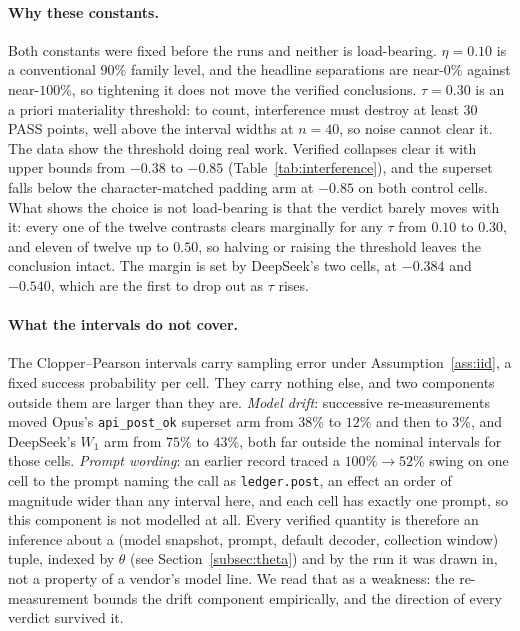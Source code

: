 \documentclass[11pt]{article}
\theoremstyle{plain}
\theoremstyle{definition}
\theoremstyle{remark}
\begin{document}
\paragraph{Why these constants.}
Both constants were fixed before the runs and neither is load-bearing. $\eta=0.10$ is a
conventional $90\%$ family level, and the headline separations are near-$0\%$ against near-$100\%$,
so tightening it does not move the verified conclusions. $\tau=0.30$ is an a priori materiality
threshold: to count, interference must destroy at least $30$ PASS points, well above the interval
widths at $n=40$, so noise cannot clear it. The data show the threshold doing real work. Verified
collapses clear it with upper bounds from $-0.38$ to $-0.85$ (Table~\ref{tab:interference}), and
the superset falls below the character-matched padding arm at $-0.85$ on both control cells. What
shows the choice is not load-bearing is that
the verdict barely moves with it: every one of the twelve contrasts clears marginally for any
$\tau$ from $0.10$ to $0.30$, and eleven of twelve up to $0.50$, so halving or raising the
threshold leaves the conclusion intact. The margin is set by DeepSeek's two cells, at $-0.384$
and $-0.540$, which are the first to drop out as $\tau$ rises.

\paragraph{What the intervals do not cover.}
The Clopper--Pearson intervals carry sampling error under Assumption~\ref{ass:iid}, a fixed success
probability per cell. They carry nothing else, and two components outside them are larger than they
are. \emph{Model drift}: successive re-measurements moved Opus's \texttt{api\_post\_ok} superset arm
from $38\%$ to $12\%$ and then to $3\%$, and DeepSeek's $W_1$ arm from $75\%$ to $43\%$, both far
outside the nominal intervals for those cells. \emph{Prompt wording}: an earlier record traced a $100\%\to52\%$ swing
on one cell to the prompt naming the call as \texttt{ledger.post}, an effect an order of magnitude
wider than any interval here, and each cell has exactly one prompt, so this component is not
modelled at all. Every verified quantity is therefore an inference about a (model snapshot, prompt,
default decoder, collection window) tuple, indexed by $\theta$ (see Section~\ref{subsec:theta}) and by
the run it was drawn in, not a property of a vendor's model line. We read that as a weakness: the
re-measurement bounds the drift component empirically, and the direction of every verdict survived
it.
\end{document}

